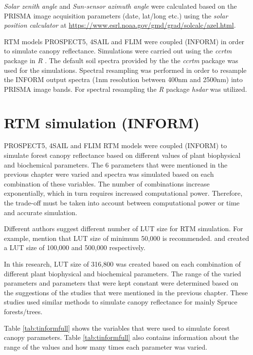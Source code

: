 \documentclass[a4paper, twoside]{templates/ociamthesis}
\begin{document}
\emph{Solar zenith angle} and \emph{Sun-sensor azimuth angle} were calculated based on the PRISMA image acquisition parameters (date, lat/long etc.) using the \emph{solar position calculator} at \url{https://www.esrl.noaa.gov/gmd/grad/solcalc/azel.html}.

RTM models PROSPECT5, 4SAIL and FLIM were coupled (INFORM) in order to simulate canopy reflectance. Simulations were carried out using the \emph{ccrtm} package \citep{ccrtm} in \emph{R} \citep{r}. The default soil spectra provided by the the \emph{ccrtm} package \citep{ccrtm} was used for the simulations. Spectral resampling was performed in order to resample the INFORM output spectra (1nm resolution between 400nm and 2500nm) into PRISMA image bands. For spectral resampling the \emph{R} package \emph{hsdar} \citep{hsdar} was utilized.

\hypertarget{rtm-simulation-inform}{%
\section{RTM simulation (INFORM)}\label{rtm-simulation-inform}}

PROSPECT5, 4SAIL and FLIM RTM models were coupled (INFORM) to simulate forest canopy reflectance based on different values of plant biophysical and biochemical parameters. The 6 parameters that were mentioned in the previous chapter were varied and spectra was simulated based on each combination of these variables. The number of combinations increase exponentially, which in turn requires increased computational power. Therefore, the trade-off must be taken into account between computational power or time and accurate simulation.

Different authors suggest different number of LUT size for RTM simulation. For example, \citet{danner2021efficient} mention that LUT size of minimum 50,000 is recommended. \citet{ali2020machine} and \citet{darvishzadeh2019mapping} created a LUT size of 100,000 and 500,000 respectively.

In this research, LUT size of 316,800 was created based on each combination of different plant biophysical and biochemical parameters. The range of the varied parameters and parameters that were kept constant were determined based on the suggestions of the studies that were mentioned in the previous chapter. These studies used similar methods to simulate canopy reflectance for mainly Spruce forests/trees.

Table \ref{tab:tinformfull} shows the variables that were used to simulate forest canopy parameters. Table \ref{tab:tinformfull} also contains information about the range of the values and how many times each parameter was varied.
\end{document}
